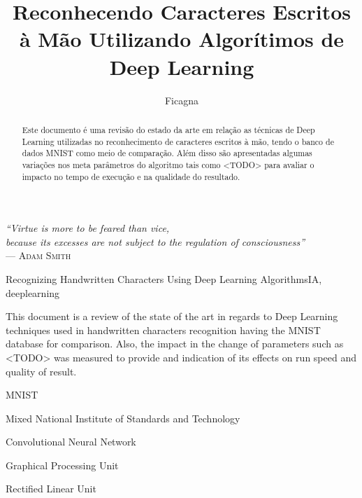 \documentclass[cic,tc]{iiufrgs}
\title{Reconhecendo Caracteres Escritos à Mão Utilizando Algorítimos de Deep Learning}
\author{Ficagna}{Alan}
\date{}{2015}
\begin{document}
\maketitle

\clearpage
\begin{flushright}
  \mbox{}\vfill
  {\sffamily\itshape{}
    ``Virtue is more to be feared than vice,\\
    because its excesses are not subject to the regulation of consciousness''\\}
  --- \textsc{Adam Smith}
\end{flushright}

\begin{abstract}

  Este documento é uma revisão do estado da arte em relação as técnicas de
Deep Learning utilizadas no reconhecimento de caracteres escritos à mão, tendo o
banco de dados MNIST como meio de comparação. Além disso são apresentadas
algumas variações nos meta parâmetros do algoritmo tais como <TODO> para
avaliar o impacto no tempo de execução e na qualidade do resultado.
\end{abstract}

\begin{englishabstract}{Recognizing Handwritten Characters Using Deep Learning Algorithms}{IA, deeplearning} %

  This document is a review of the state of the art in regards to Deep Learning
techniques used in handwritten characters recognition having the MNIST
database for comparison. Also, the impact in the change of parameters such as
<TODO> was measured to provide and indication of its effects on run speed and
quality of result.

\end{englishabstract}

\listoffigures
\listoftables
\begin{listofabbrv}{MNIST} %
 \item[MNIST] Mixed National Institute of Standards and Technology
 \item[CNN] Convolutional Neural Network
 \item[GPU] Graphical Processing Unit
 \item[ReLU] Rectified Linear Unit
\end{listofabbrv}
\tableofcontents
\end{document}
